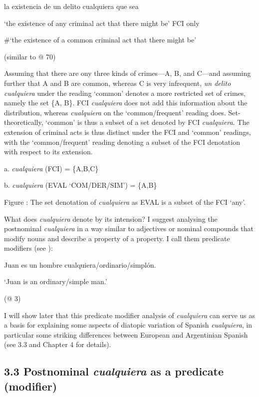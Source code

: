 \documentclass[output=paper]{langscibook}
\begin{document}
  la existencia de un delito cualquiera que sea

  ‘the existence of any criminal act that there might be’ FCI only

  \#‘the existence of a common criminal act that there might be’  

  (similar to @ 70)

Assuming that there are ony three kinds of crimes—A, B, and C—and assuming further that A and B are common, whereas C is very infrequent, \textit{un delito cualquiera} under the reading ‘common’ denotes a more restricted set of crimes, namely the set \{A, B\}. FCI \textit{cualquiera} does not add this information about the distribution, whereas \textit{cualquiera} on the ‘common/frequent’ reading does. Set-theoretically, ‘common’ is thus a subset of a set denoted by FCI \textit{cualquiera.} The extension of criminal acts is thus distinct under the FCI and ‘common’ readings, with the ‘common/frequent’ reading denoting a subset of the FCI denotation with respect to its extension.

  a.  \textit{cualquiera} (FCI) = \{A,B,C\}

  b.  \textit{cualquiera} (EVAL ‘COM/DER/SIM’) = \{A,B\}

\begin{styletablecaption}
Figure : The set denotation of \textit{cualquiera} as EVAL is a subset of the FCI ‘any’.
\end{styletablecaption}

What does \textit{cualquiera} denote by its intension? I suggest analysing the postnominal \textit{cualquiera} in a way similar to adjectives or nominal compounds that modify nouns and describe a property of a property. I call them predicate modifiers (see ):

  Juan es un hombre cualquiera/ordinario/simplón.

  ‘Juan is an ordinary/simple man.’

  (@ 3)

I will show later that this predicate modifier analysis of \textit{cualquiera} can serve us as a basis for explaining some aspects of diatopic variation of Spanish \textit{cualquiera}, in particular some striking differences between European and Argentinian Spanish (see 3.3 and Chapter 4 for details). 

\subsection{\textbf{3.3} \textbf{Postnominal} \textbf{\textit{cualquiera}} \textbf{as} \textbf{a} \textbf{predicate} \textbf{(modifier)}}
\end{document}
